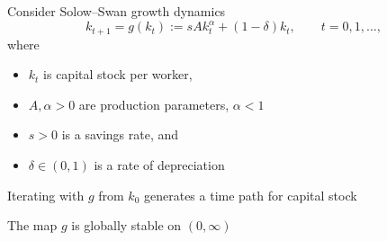 \begin{frame}
    
    \Eg Consider Solow--Swan growth dynamics 
    \begin{equation*}
        \label{eq:solow}
        k_{t+1} = g(k_t) := s A k_t^\alpha + (1 - \delta) k_t,
        \qquad t = 0, 1, \ldots,
    \end{equation*}
    where 
    \begin{itemize}
        \item $k_t$ is capital stock per worker,
        \item $A, \alpha >0$ are production parameters, $\alpha < 1$
        \item $s > 0$ is a savings rate, and
        \item $\delta \in (0,1)$ is a rate of depreciation  
    \end{itemize}

    Iterating with $g$ from $k_0$ generates a time path for capital stock

    The map $g$ is globally stable on $(0, \infty)$

\end{frame}

\begin{frame}
    
    \begin{figure}
       \centering
    \end{figure}

\end{frame}

